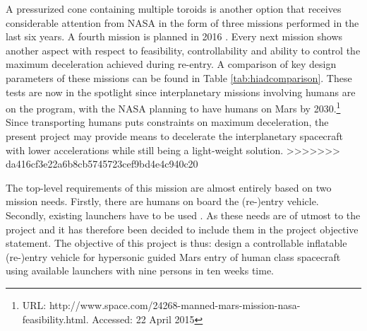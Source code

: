 A pressurized cone containing multiple toroids is another option that receives considerable attention from NASA in the form of three missions performed in the last six years. A fourth mission is planned in 2016 \cite{ivre,irve2,irve3,thor}. Every next mission shows another aspect with respect to feasibility, controllability and ability to control the maximum deceleration achieved during re-entry. A comparison of key design parameters of these missions can be found in Table \ref{tab:hiadcomparison}.
These tests are now in the spotlight since interplanetary missions involving humans are on the program, with the NASA planning to have humans on Mars by 2030.\footnote{URL: http://www.space.com/24268-manned-mars-mission-nasa-feasibility.html. Accessed: 22 April 2015} Since transporting humans puts constraints on maximum deceleration, the present project may provide means to decelerate the interplanetary spacecraft with lower accelerations while still being a light-weight solution.
>>>>>>> da416cf3e22a6b8cb5745723cef9bd4e4c940c20

The top-level requirements of this mission are almost entirely based on two mission needs. Firstly, there are humans on board the (re-)entry vehicle. Secondly, existing launchers have to be used . As these needs are of utmost to the project and it has therefore been decided to include them in the project objective statement. The objective of this project is thus: design a controllable inflatable (re-)entry vehicle for hypersonic guided Mars entry of human class spacecraft using available launchers with nine persons in ten weeks time.

